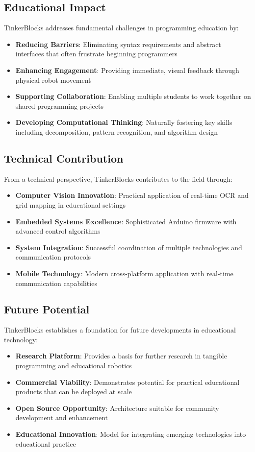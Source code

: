 \subsection{Educational Impact}

TinkerBlocks addresses fundamental challenges in programming education by:
\begin{itemize}
    \item \textbf{Reducing Barriers}: Eliminating syntax requirements and abstract interfaces that often frustrate beginning programmers
    \item \textbf{Enhancing Engagement}: Providing immediate, visual feedback through physical robot movement
    \item \textbf{Supporting Collaboration}: Enabling multiple students to work together on shared programming projects
    \item \textbf{Developing Computational Thinking}: Naturally fostering key skills including decomposition, pattern recognition, and algorithm design
\end{itemize}

\subsection{Technical Contribution}

From a technical perspective, TinkerBlocks contributes to the field through:
\begin{itemize}
    \item \textbf{Computer Vision Innovation}: Practical application of real-time OCR and grid mapping in educational settings
    \item \textbf{Embedded Systems Excellence}: Sophisticated Arduino firmware with advanced control algorithms
    \item \textbf{System Integration}: Successful coordination of multiple technologies and communication protocols
    \item \textbf{Mobile Technology}: Modern cross-platform application with real-time communication capabilities
\end{itemize}

\subsection{Future Potential}

TinkerBlocks establishes a foundation for future developments in educational technology:
\begin{itemize}
    \item \textbf{Research Platform}: Provides a basis for further research in tangible programming and educational robotics
    \item \textbf{Commercial Viability}: Demonstrates potential for practical educational products that can be deployed at scale
    \item \textbf{Open Source Opportunity}: Architecture suitable for community development and enhancement
    \item \textbf{Educational Innovation}: Model for integrating emerging technologies into educational practice
\end{itemize}

